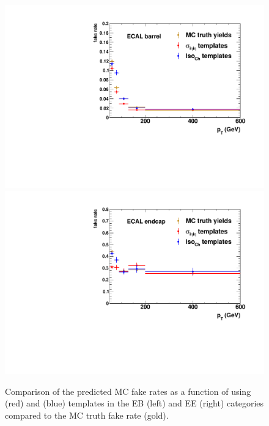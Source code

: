 \begin{figure}[!htbp]
  \centering
  \includegraphics[scale=0.40]{figures/closure_test_fake_rates_comparison_EB.pdf}
  \includegraphics[scale=0.40]{figures/closure_test_fake_rates_comparison_EE.pdf}
  \caption{Comparison of the predicted MC fake rates as a function of \pt using \sieie (red) and \chiso (blue) templates in the EB (left) and EE (right) categories compared to the MC truth fake rate (gold).}
  \label{fig:closure_test_fake_rates_comparison}
\end{figure}

